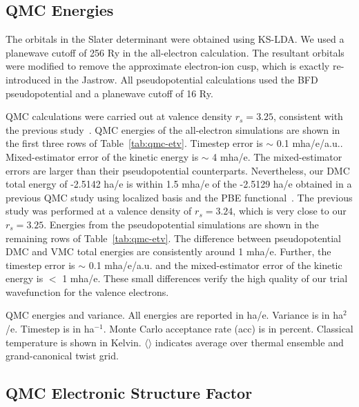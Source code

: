 \documentclass[aps,prl,superscriptaddress]{revtex4-1}
\begin{document}
\subsection{QMC Energies}

The orbitals in the Slater determinant were obtained using KS-LDA. We used a planewave cutoff of 256 Ry in the all-electron calculation. The resultant orbitals were modified to remove the approximate electron-ion cusp, which is exactly re-introduced in the Jastrow. All pseudopotential calculations used the BFD pseudopotential and a planewave cutoff of 16 Ry.

QMC calculations were carried out at valence density $r_s=3.25$, consistent with the previous study~\cite{Filippi1999}. 
QMC energies of the all-electron simulations are shown in the first three rows of Table~\ref{tab:qmc-etv}. Timestep error is $\sim$ 0.1 mha/e/a.u.. Mixed-estimator error of the kinetic energy is $\sim$ 4 mha/e. The mixed-estimator errors are larger than their pseudopotential counterparts. Nevertheless, our DMC total energy of -2.5142 ha/e is within 1.5 mha/e of the -2.5129 ha/e obtained in a previous QMC study using localized basis and the PBE functional~\cite{Rasch2015}. The previous study was performed at a valence density of $r_s=3.24$, which is very close to our $r_s=3.25$.
Energies from the pseudopotential simulations are shown in the remaining rows of Table~\ref{tab:qmc-etv}. The difference between pseudopotential DMC and VMC total energies are consistently around 1 mha/e. Further, the timestep error is $\sim$ 0.1 mha/e/a.u. and the mixed-estimator error of the kinetic energy is $<$ 1 mha/e. These small differences verify the high quality of our trial wavefunction for the valence electrons.

\begin{table}[h]
\caption{QMC energies and variance. All energies are reported in ha/e. Variance is in ha$^2$/e. Timestep is in ha$^{-1}$. Monte Carlo acceptance rate (acc) is in percent. Classical temperature is shown in Kelvin. $\langle\rangle$ indicates average over thermal ensemble and grand-canonical twist grid.}

\label{tab:qmc-etv}
\end{table}

\subsection{QMC Electronic Structure Factor}
\end{document}
